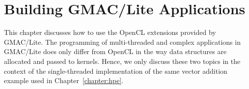 \chapter{Building GMAC\slash Lite Applications}

This chapter discusses how to use the OpenCL extensions provided by GMAC\slash Lite. The programming 
of multi\hyp{}threaded and complex applications in GMAC\slash Lite does only differ from OpenCL in 
the way data structures are allocated and passed to kernels. Hence, we only discuss these two topics 
in the context of the single\hyp{}threaded implementation of the same vector addition example used 
in Chapter~\ref{chapter:hpe}. 



